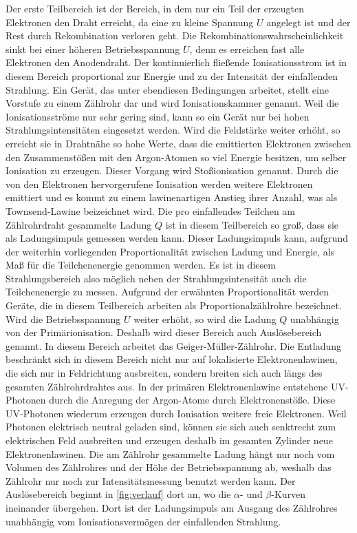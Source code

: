 Der erste Teilbereich ist der Bereich, in dem nur ein Teil der erzeugten Elektronen den Draht erreicht, da eine zu kleine Spannung $U$ angelegt ist 
und der Rest durch Rekombination verloren geht. \newline
Die Rekombinationswahrscheinlichkeit sinkt bei einer höheren Betriebsspannung $U$, denn es erreichen fast alle Elektronen den Anodendraht. 
Der kontinuierlich fließende Ionisationsstrom ist in diesem Bereich proportional zur Energie und zu der Intensität der einfallenden Strahlung. Ein Gerät,
das unter ebendiesen Bedingungen arbeitet, stellt eine Vorstufe zu einem Zählrohr dar und wird Ionisationskammer genannt. Weil die Ionisationsströme nur sehr gering sind, kann so ein Gerät nur bei
hohen Strahlungsintensitäten eingesetzt werden. \newline
Wird die Feldstärke weiter erhöht, so erreicht sie in Drahtnähe so hohe Werte, dass die emittierten Elektronen zwischen den Zusammenstößen mit den Argon-Atomen so viel Energie besitzen, um selber Ionisation zu erzeugen.
Dieser Vorgang wird Stoßionisation genannt. Durch die von den Elektronen hervorgerufene Ionisation werden weitere Elektronen emittiert und es kommt zu einem lawinenartigen Anstieg ihrer Anzahl, was als Townsend-Lawine beizeichnet wird. 
Die pro einfallendes Teilchen am Zählrohrdraht gesammelte Ladung $Q$ ist in diesem Teilbereich so groß, dass sie als Ladungsimpuls gemessen werden kann. Dieser Ladungsimpuls kann, aufgrund der weiterhin vorliegenden Proportionalität zwischen Ladung und Energie,
als Maß für die Teilchenenergie genommen werden. Es ist in diesem Strahlungsbereich also möglich neben der Strahlungsintensität auch die Teilchenenergie zu messen. Aufgrund der erwähnten Proportionalität werden Geräte, die in diesem Teilbereich arbeiten als Proportionalzählrohre bezeichnet. \newline
Wird die Betriebsspannung $U$ weiter erhöht, so wird die Ladung $Q$ unabhängig von der Primärionisation. Deshalb wird dieser Bereich auch Auslösebereich genannt. In diesem Bereich arbeitet das Geiger-Müller-Zählrohr.
Die Entladung beschränkt sich in diesem Bereich nicht nur auf lokalisierte Elektronenlawinen, die sich nur in Feldrichtung ausbreiten, sondern breiten sich auch längs des gesamten Zählrohrdrahtes aus.
In der primären Elektronenlawine entstehene UV-Photonen durch die Anregung der Argon-Atome durch Elektronenstöße. Diese UV-Photonen wiederum erzeugen durch Ionisation weitere freie Elektronen. Weil Photonen elektrisch neutral geladen sind, können sie sich auch senktrecht zum elektrischen Feld ausbreiten
und erzeugen deshalb im gesamten Zylinder neue Elektronenlawinen. Die am Zählrohr  gesammelte Ladung hängt nur noch vom Volumen des Zählrohres und der Höhe der Betriebsspannung ab, weshalb das Zählrohr nur noch zur Intensitätsmessung benutzt werden kann.
Der Auslösebereich beginnt in \autoref{fig:verlauf} dort an, wo die $\alpha$- und $\beta$-Kurven ineinander übergehen. Dort ist der Ladungsimpuls am Ausgang des Zählrohres unabhängig vom Ionisationsvermögen der einfallenden Strahlung.


